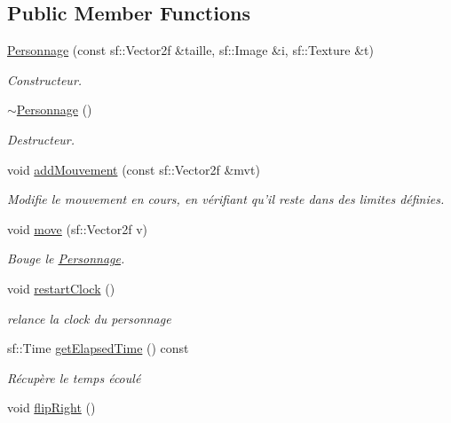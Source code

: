 \subsection*{Public Member Functions}
\begin{DoxyCompactItemize}
\item 
\hyperlink{class_personnage_ae031dfa471739621e0a908e4946ea6ad}{Personnage} (const sf\+::\+Vector2f \&taille, sf\+::\+Image \&i, sf\+::\+Texture \&t)
\begin{DoxyCompactList}\small\item\em Constructeur. \end{DoxyCompactList}\item 
\hyperlink{class_personnage_a05bdf2a469885bb1fbb6c2e8f98972ab}{$\sim$\+Personnage} ()
\begin{DoxyCompactList}\small\item\em Destructeur. \end{DoxyCompactList}\item 
void \hyperlink{class_personnage_acddd15a955d84943f587ba9f799c14b0}{add\+Mouvement} (const sf\+::\+Vector2f \&mvt)
\begin{DoxyCompactList}\small\item\em Modifie le mouvement en cours, en vérifiant qu'il reste dans des limites définies. \end{DoxyCompactList}\item 
void \hyperlink{class_personnage_a23827b5a59cc4a5372c01ec45d3c5fb7}{move} (sf\+::\+Vector2f v)
\begin{DoxyCompactList}\small\item\em Bouge le \hyperlink{class_personnage}{Personnage}. \end{DoxyCompactList}\item 
void \hyperlink{class_personnage_abfd05381e426b6b68eaa51309e66736c}{restart\+Clock} ()
\begin{DoxyCompactList}\small\item\em relance la clock du personnage \end{DoxyCompactList}\item 
sf\+::\+Time \hyperlink{class_personnage_aa226c2909c41a07f5fdf884f293e7d9b}{get\+Elapsed\+Time} () const 
\begin{DoxyCompactList}\small\item\em Récupère le temps écoulé \end{DoxyCompactList}\item 
void \hyperlink{class_personnage_a1fb547b3bdbd33437a7a07f8479dced3}{flip\+Right} ()

\end{DoxyCompactItemize}
